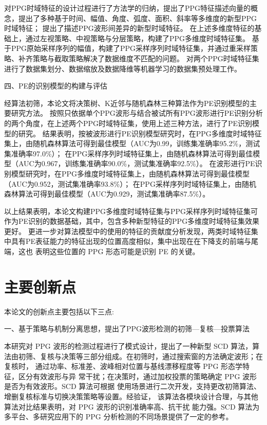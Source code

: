 对PPG时域特征的设计过程进行了方法学的归纳，提出了PPG特征描述向量的概念，提出了多种基于时间、幅值、角度、弧度、面积、斜率等多维度的新型PPG时域特征；
提出了描述PPG波形间差异的新型时域特征。
在上述多维度特征的基础上，通过左视策略、中视策略与分层策略，构建了PPG多维度时域特征集。
基于PPG原始采样序列的幅值，构建了PPG采样序列时域特征集，并通过重采样策略、补齐策略与截取策略解决了数据维度不匹配的问题。
对两个PPG时域特征集进行了数据集划分、数据缩放及数据降维等机器学习的数据集预处理工作。

四、PE的识别模型的构建与评估

经算法初筛，本论文将决策树、K近邻与随机森林三种算法作为PE识别模型的主要研究方法。
按照只依据单个PPG波形与结合被试所有PPG波形进行PE识别分析的两个角度，在上述两个PPG时域特征集，使用上述三种方法，进行了PE识别模型的研究。
结果表明，按被波形进行PE识别模型研究时，在PPG多维度时域特征集上，由随机森林算法可得到最佳模型（AUC为0.99，训练集准确率95.2\%，测试集准确率97.0\%）；
在PPG采样序列时域特征集上，由随机森林算法可得到最佳模型（AUC为0.967，训练集准确率90.0\%，测试集准确率92.5\%）。
在波形进行PE识别模型研究时，在PPG多维度时域特征集上，由随机森林算法可得到最佳模型（AUC为0.952，测试集准确率93.8\%）；
在PPG采样序列时域特征集上，由随机森林算法可得到最佳模型（AUC为0.929，测试集准确率87.5\%）。

以上结果表明，本论文构建PPG多维度时域特征集与PPG采样序列时域特征集可作为PE识别的数据基础，其中，包含多种新型特征的PPG多维度时域特征集效果更好。
更进一步对算法模型中的使用的特征的贡献度分析发现，两类时域特征集中具有PE表征能力的特征出现的位置高度相似，集中出现在在下降支的前端与尾端，这也
表明这些位置的 PPG 形态可能是识别 PE 的关键。

\section{主要创新点}
本论文的创新点主要包括以下三点:

一、基于策略与机制分离思想，提出了PPG波形检测的初筛—复核—投票算法

本研究对 PPG 波形的检测过程进行了模式设计，提出了一种新型 SCD 算法，算
法由初筛、复核与决策等三部分组成。在初筛时，通过搜索窗的方法确定波形；在复核时，
通过功率、标准差、波峰相对位置与基线漂移程度等 PPG 形态学特征，区分有效波形与异
常干扰；在决策时，通过加权投票的策略确定 PPG 波形是否为有效波形。SCD 算法可根据
使用场景进行二次开发，支持更改初筛算法、增删复核标准与切换决策策略等设置。经验证，
该算法各模块设计合理，与其他算法对比结果表明，对 PPG 波形的识别准确率高、抗干扰
能力强。SCD 算法为多平台、多研究应用下的 PPG 分析检测的不同场景提供了一定的参考。


